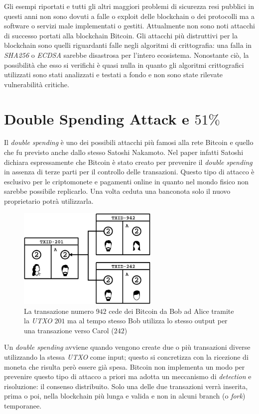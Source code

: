 Gli esempi riportati e tutti gli altri maggiori problemi di sicurezza resi pubblici in questi anni non sono dovuti a falle o exploit delle blockchain o dei protocolli ma a software o servizi male implementati o gestiti. Attualmente non sono noti attacchi di successo portati alla blockchain Bitcoin.\newline
Gli attacchi più distruttivi per la blockchain sono quelli riguardanti falle negli algoritmi di crittografia: una falla in \textit{SHA256} o \textit{ECDSA} sarebbe disastrosa per l'intero ecosistema. Nonostante ciò, la possibilità che esso si verifichi è quasi nulla in quanto gli algoritmi crittografici utilizzati sono stati analizzati e testati a fondo e non sono state rilevate vulnerabilità critiche.

\section{Double Spending Attack e $51\%$}
Il \textit{double spending} è uno dei possibili attacchi più famosi alla rete Bitcoin e quello che fu previsto anche dallo stesso Satoshi Nakamoto. Nel paper infatti Satoshi dichiara espressamente che Bitcoin è stato creato per prevenire il \textit{double spending} in assenza di terze parti per il controllo delle transazioni.\newline
Questo tipo di attacco è esclusivo per le criptomonete e pagamenti online in quanto nel mondo fisico non sarebbe possibile replicarlo. Una volta ceduta una banconota solo il nuovo proprietario potrà utilizzarla.
\begin{figure}
    \centering
    \includegraphics[width=0.6\textwidth]{images/double_spending.png}
    \caption{La transazione numero $942$ cede dei Bitcoin da Bob ad Alice tramite la \textit{UTXO} $201$ ma al tempo stesso Bob utilizza lo stesso output per una transazione verso Carol ($242$) \cite{owning}}
\end{figure}
Un \textit{double spending} avviene quando vengono create due o più transazioni diverse utilizzando la stessa \textit{UTXO} come input; questo si concretizza con la ricezione di moneta che risulta però essere già spesa. Bitcoin non implementa un modo per prevenire questo tipo di attacco a priori ma adotta un meccanismo di \textit{detection} e risoluzione: il consenso distribuito. Solo una delle due transazioni verrà inserita, prima o poi, nella blockchain più lunga e valida e non in alcuni branch (o \textit{fork}) temporanee.\newline
